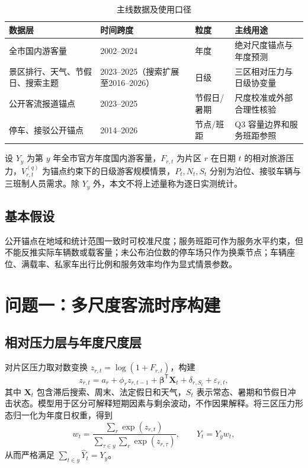 \documentclass[UTF8,12pt,a4paper]{ctexart}
\begin{document}
\begin{table}[H]\centering
\caption{主线数据及使用口径}\label{tab:data}
\begin{tabular}{p{3.2cm}p{2cm}p{2.4cm}p{5cm}}\toprule
数据层 & 时间跨度 & 粒度 & 主线用途\\ \midrule
全市国内游客量 & 2002--2024 & 年度 & 绝对尺度锚点与年度预测\\
景区排行、天气、节假日、搜索主题 & 2023--2025（搜索扩展至2016--2026） & 日级 & 三区相对压力与日级协变量\\
公开客流报道锚点 & 2023--2025 & 节假日/暑期 & 尺度校准或外部合理性核验\\
停车、接驳公开锚点 & 2014--2026 & 节点/班距 & Q3 容量边界和服务班距参照\\ \bottomrule
\end{tabular}
\end{table}

设 $Y_y$ 为第 $y$ 年全市官方年度国内游客量，$F_{r,t}$ 为片区 $r$ 在日期 $t$ 的相对旅游压力，$V_{r,t}^{(q)}$ 为锚点约束下的日级游客规模情景，$P_t,N_t,S_t$ 分别为泊位、接驳车辆与三班制人员需求。除 $Y_y$ 外，本文不将上述量称为逐日实测统计。

\subsection{基本假设}
公开锚点在地域和统计范围一致时可校准尺度；服务班距可作为服务水平约束，但不能反推实际车辆数或载客量；未公布泊位数的停车场只作为换乘节点；车辆座位、满载率、私家车出行比例和服务效率均作为显式情景参数。

\section{问题一：多尺度客流时序构建}
\subsection{相对压力层与年度尺度层}
对片区压力取对数变换 $z_{r,t}=\log(1+F_{r,t})$，构建
\begin{equation}
z_{r,t}=a_r+\phi_rz_{r,t-1}+\boldsymbol\beta^{\mathsf T}\mathbf X_t+\delta_{r,S_t}+\varepsilon_{r,t},
\end{equation}
其中 $\mathbf X_t$ 包含滞后搜索、周末、法定假日和天气，$S_t$ 表示常态、暑期和节假日冲击状态。模型用于区分可解释短期因素与剩余波动，不作因果解释。将三区压力形态归一化为年度日权重，得到
\begin{equation}
w_t=\frac{\sum_r\exp(z_{r,t})}{\sum_{\tau\in y}\sum_r\exp(z_{r,\tau})},\qquad \widehat Y_t=Y_yw_t,
\end{equation}
从而严格满足 $\sum_{t\in y}\widehat Y_t=Y_y$。
\end{document}
